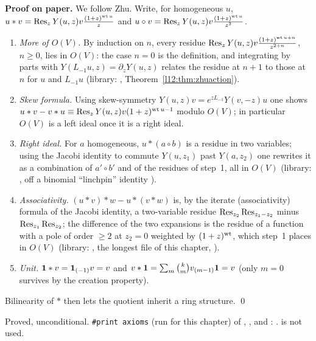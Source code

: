 \textbf{Proof on paper.} We follow Zhu. Write, for homogeneous $u$,
$u*v = \operatorname{Res}_zY(u,z)v\frac{(1+z)^{\operatorname{wt} u}}{z}$ and $u\circ v = \operatorname{Res}_zY(u,z)v\frac{(1+z)^{\operatorname{wt} u}}{z^2}$.
\begin{enumerate}
\item \emph{More of $O(V)$.} By induction on $n$, every residue
  $\operatorname{Res}_zY(u,z)v\frac{(1+z)^{\operatorname{wt} u+n}}{z^{2+n}}$, $n\ge0$, lies in $O(V)$: the case $n=0$ is the definition, and
  integrating by parts with $Y(L_{-1}u,z) = \partial_zY(u,z)$ relates the residue at $n+1$ to those at $n$ for
  $u$ and $L_{-1}u$ (library: , Theorem~\ref{l12:thm:zhuaction}).
\item \emph{Skew formula.} Using skew-symmetry $Y(u,z)v = e^{zL_{-1}}Y(v,-z)u$ one shows
  $u*v - v*u \equiv \operatorname{Res}_zY(u,z)v(1+z)^{\operatorname{wt} u-1}$ modulo $O(V)$; in particular $O(V)$ is a left ideal once it is a
  right ideal.
\item \emph{Right ideal.} For $a$ homogeneous, $u*(a\circ b)$ is a residue in two variables; using the Jacobi
  identity to commute $Y(u,z_1)$ past $Y(a,z_2)$ one rewrites it as a combination of $a'\circ b'$ and of the
  residues of step~1, all in $O(V)$ (library: , off a binomial ``linchpin''
  identity ).
\item \emph{Associativity.} $(u*v)*w - u*(v*w)$ is, by the iterate (associativity) formula of the Jacobi
  identity, a two-variable residue $\operatorname{Res}_{z_2}\operatorname{Res}_{z_1-z_2}$ minus $\operatorname{Res}_{z_1}\operatorname{Res}_{z_2}$; the difference of the
  two expansions is the residue of a function with a pole of order $\ge2$ at $z_2 = 0$ weighted by
  $(1+z)^{\operatorname{wt}}$, which step~1 places in $O(V)$ (library: , the longest file of this
  chapter, ).
\item \emph{Unit.} $\mathbf{1}*v = \mathbf{1}_{(-1)}v = v$ and $v*\mathbf{1} = \sum_m\binom km v_{(m-1)}\mathbf{1} = v$
  (only $m=0$ survives by the creation property).
\end{enumerate}
Bilinearity of $*$ then lets the quotient inherit a ring structure. \qed

\begin{status}
Proved, unconditional. \texttt{\#print axioms} (run for this chapter) of ,
,  and :
.  is not used.
\end{status}


